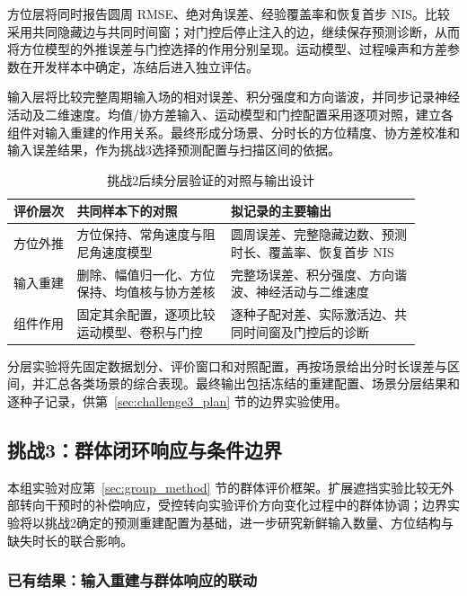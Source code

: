 \documentclass[UTF8,fontset=windows,11pt]{ctexart}
\begin{document}
方位层将同时报告圆周 RMSE、绝对角误差、经验覆盖率和恢复首步 NIS。比较采用共同隐藏边与共同时间窗；对门控后停止注入的边，继续保存预测诊断，从而将方位模型的外推误差与门控选择的作用分别呈现。运动模型、过程噪声和方差参数在开发样本中确定，冻结后进入独立评估。

输入层将比较完整周期输入场的相对误差、积分强度和方向谐波，并同步记录神经活动及二维速度。均值/协方差输入、运动模型和门控配置采用逐项对照，建立各组件对输入重建的作用关系。最终形成分场景、分时长的方位精度、协方差校准和输入误差结果，作为挑战3选择预测配置与扫描区间的依据。



\begin{table}[!htbp]
\centering\small
\caption{挑战2后续分层验证的对照与输出设计}
\label{tab:layered_validation_plan}
\begin{tabular}{>{\raggedright\arraybackslash}p{0.14\linewidth}
                >{\raggedright\arraybackslash}p{0.34\linewidth}
                >{\raggedright\arraybackslash}p{0.42\linewidth}}
\toprule
评价层次 & 共同样本下的对照 & 拟记录的主要输出\\
\midrule
方位外推 & 方位保持、常角速度与阻尼角速度模型 & 圆周误差、完整隐藏边数、预测时长、覆盖率、恢复首步 NIS\\[3pt]
输入重建 & 删除、幅值归一化、方位保持、均值核与协方差核 & 完整场误差、积分强度、方向谐波、神经活动与二维速度\\[3pt]
组件作用 & 固定其余配置，逐项比较运动模型、卷积与门控 & 逐种子配对差、实际激活边、共同时间窗及门控后的诊断\\
\bottomrule
\end{tabular}
\end{table}
分层实验将先固定数据划分、评价窗口和对照配置，再按场景给出分时长误差与区间，并汇总各类场景的综合表现。最终输出包括冻结的重建配置、场景分层结果和逐种子记录，供第~\ref{sec:challenge3_plan} 节的边界实验使用。


\subsection{挑战3：群体闭环响应与条件边界}\label{sec:challenge3_results}

本组实验对应第~\ref{sec:group_method} 节的群体评价框架。扩展遮挡实验比较无外部转向干预时的补偿响应，受控转向实验评价方向变化过程中的群体协调；边界实验将以挑战2确定的预测重建配置为基础，进一步研究新鲜输入数量、方位结构与缺失时长的联合影响。


\subsubsection{已有结果：输入重建与群体响应的联动}
\end{document}
